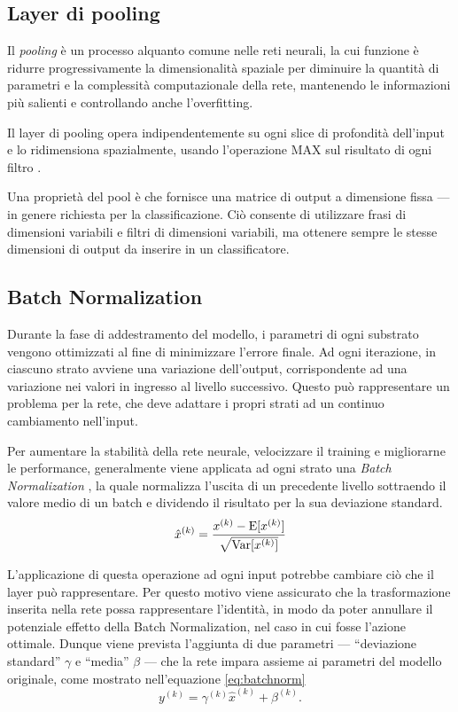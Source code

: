 \subsection{Layer di pooling}
\label{subsec:maxpool}

Il \emph{pooling} è un processo alquanto comune nelle reti neurali, la cui funzione è ridurre progressivamente la dimensionalità spaziale per diminuire la quantità di parametri e la complessità computazionale della rete, mantenendo le informazioni più salienti e controllando anche l'overfitting.

Il layer di pooling opera indipendentemente su ogni slice di profondità dell'input e lo ridimensiona spazialmente, usando l'operazione MAX sul risultato di ogni filtro \cite{karpathy2016cs231n}. 

Una proprietà del pool è che fornisce una matrice di output a dimensione fissa --- in genere richiesta per la classificazione. Ciò consente di utilizzare frasi di dimensioni variabili e filtri di dimensioni variabili, ma ottenere sempre le stesse dimensioni di output da inserire in un classificatore.

\subsection{Batch Normalization}
\label{subsec:normalization}

Durante la fase di addestramento del modello, i parametri di ogni substrato vengono ottimizzati al fine di minimizzare l'errore finale.
Ad ogni iterazione, in ciascuno strato avviene una variazione dell'output, corrispondente ad una variazione nei valori in ingresso al livello successivo.
Questo può rappresentare un problema per la rete, che deve adattare i propri strati ad un continuo cambiamento nell'input. 

Per aumentare la stabilità della rete neurale, velocizzare il training e migliorarne le performance, generalmente viene applicata ad ogni strato una \emph{Batch Normalization}  \cite{ioffe2015batch}, la quale normalizza l'uscita di un precedente livello sottraendo il valore medio di un batch e dividendo il risultato per la sua deviazione standard.
\begin{equation}
	\hat{x}^{(k)}=\frac{x^{(k)}-\operatorname{E}[x^{(k)}]}{\sqrt{\operatorname{Var}[x^{(k)}]}}
\end{equation}

L'applicazione di questa operazione ad ogni input potrebbe cambiare ciò che il layer può rappresentare. Per questo motivo viene assicurato che la trasformazione inserita nella rete possa rappresentare l'identità, in modo da poter annullare il potenziale effetto della Batch Normalization, nel caso in cui fosse l'azione ottimale.
Dunque viene prevista l'aggiunta di due parametri --- ``deviazione standard'' $\gamma$ e ``media'' $\beta$ --- che la rete impara assieme ai parametri del modello originale, come mostrato nell'equazione \ref{eq:batchnorm}
\begin{equation}
	y^{(k)}=\gamma^{(k)}\hat{x}^{(k)}+\beta^{(k)}\mbox{.}
	\label{eq:batchnorm}
\end{equation}

